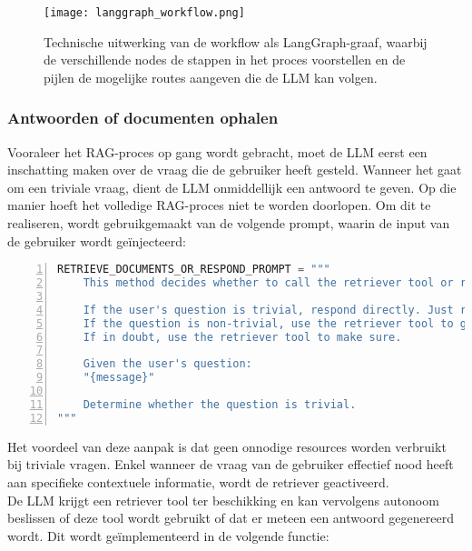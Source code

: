 \begin{figure}[H]
    \centering
    \texttt{[image: langgraph\_workflow.png]}
    \caption{Technische uitwerking van de workflow als LangGraph-graaf, waarbij de verschillende nodes de stappen in het proces voorstellen en de pijlen de mogelijke routes aangeven die de LLM kan volgen.}
    \label{fig:langgraph}
\end{figure}

\subsubsection{Antwoorden of documenten ophalen}

Vooraleer het RAG-proces op gang wordt gebracht, moet de LLM eerst een inschatting maken over de vraag die de gebruiker heeft gesteld. Wanneer het gaat om een triviale vraag, dient de LLM onmiddellijk een antwoord te geven. Op die manier hoeft het volledige RAG-proces niet te worden doorlopen. Om dit te realiseren, wordt gebruikgemaakt van de volgende prompt, waarin de input van de gebruiker wordt geïnjecteerd: 

\begin{lstlisting}[basicstyle=\small, frame=single, breaklines=true, postbreak=\mbox{\textcolor{red}{$\hookrightarrow$}\space}, escapeinside ={\%,}, escapechar={!}, numbers=left, language=Python, caption=Prompt voor beslissen tussen direct antwoord of documentopvraging]
RETRIEVE_DOCUMENTS_OR_RESPOND_PROMPT = """
    This method decides whether to call the retriever tool or respond directly.
    
    If the user's question is trivial, respond directly. Just respond directly. Do not show your reasoning or thinking process.
    If the question is non-trivial, use the retriever tool to generate a response.
    If in doubt, use the retriever tool to make sure.
    
    Given the user's question:  
    "{message}"
    
    Determine whether the question is trivial. 
"""
\end{lstlisting}

Het voordeel van deze aanpak is dat geen onnodige resources worden verbruikt bij triviale vragen. Enkel wanneer de vraag van de gebruiker effectief nood heeft aan specifieke contextuele informatie, wordt de retriever geactiveerd.
\\[1em]
De LLM krijgt een retriever tool ter beschikking en kan vervolgens autonoom beslissen of deze tool wordt gebruikt of dat er meteen een antwoord gegenereerd wordt. Dit wordt geïmplementeerd in de volgende functie:

